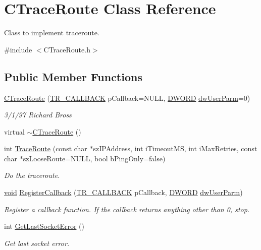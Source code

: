\hypertarget{class_c_trace_route}{\section{\-C\-Trace\-Route \-Class \-Reference}
\label{class_c_trace_route}
}


\-Class to implement traceroute.  




{\ttfamily \#include $<$\-C\-Trace\-Route.\-h$>$}

\subsection*{\-Public \-Member \-Functions}
\begin{DoxyCompactItemize}
\item 
\hyperlink{class_c_trace_route_a38e76b2a92dc94e2ae5513a72f204a07}{\-C\-Trace\-Route} (\hyperlink{_c_trace_route_8h_af0130bce4928d8759ed87b2a5fd6e038}{\-T\-R\-\_\-\-C\-A\-L\-L\-B\-A\-C\-K} p\-Callback=\-N\-U\-L\-L, \hyperlink{_x_plat_8h_aa39b39d94407451a6ec0226479db68cf}{\-D\-W\-O\-R\-D} \hyperlink{class_c_trace_route_a8cfc291a0ac1b247afe8acc03e490ffe}{dw\-User\-Parm}=0)
\begin{DoxyCompactList}\small\item\em 3/1/97 \-Richard \-Bross \end{DoxyCompactList}\item 
virtual \hyperlink{class_c_trace_route_adb1ba8e4b9d0db40f21cb935c386d3f0}{$\sim$\-C\-Trace\-Route} ()
\item 
int \hyperlink{class_c_trace_route_a9cbed8b955ce2d953d0f1f4583d3405a}{\-Trace\-Route} (const char $\ast$sz\-I\-P\-Address, int i\-Timeout\-M\-S, int i\-Max\-Retries, const char $\ast$sz\-Loose\-Route=\-N\-U\-L\-L, bool b\-Ping\-Only=false)
\begin{DoxyCompactList}\small\item\em \-Do the traceroute. \end{DoxyCompactList}\item 
\hyperlink{_cpclient_8h_a6464f7480a0fd0ee170cba12b2c0497f}{void} \hyperlink{class_c_trace_route_a726b14f9e1952d8540e1cd1926cc1443}{\-Register\-Callback} (\hyperlink{_c_trace_route_8h_af0130bce4928d8759ed87b2a5fd6e038}{\-T\-R\-\_\-\-C\-A\-L\-L\-B\-A\-C\-K} p\-Callback, \hyperlink{_x_plat_8h_aa39b39d94407451a6ec0226479db68cf}{\-D\-W\-O\-R\-D} \hyperlink{class_c_trace_route_a8cfc291a0ac1b247afe8acc03e490ffe}{dw\-User\-Parm})
\begin{DoxyCompactList}\small\item\em \-Register a callback function. \-If the callback returns anything other than 0, stop. \end{DoxyCompactList}\item 
int \hyperlink{class_c_trace_route_a32da5bff1922a12bff99c27fb1397afd}{\-Get\-Last\-Socket\-Error} ()
\begin{DoxyCompactList}\small\item\em \-Get last socket error. \end{DoxyCompactList}\end{DoxyCompactItemize}
